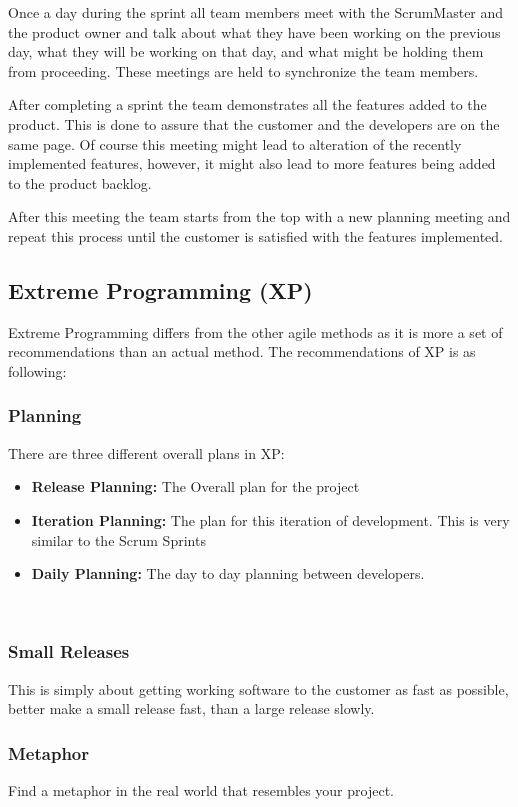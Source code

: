 Once a day during the sprint all team members meet with the ScrumMaster and the product owner and talk about what they have been working on the previous day, what they will be working on that day, and what might be holding them from proceeding. These meetings are held to synchronize the team members.

After completing a sprint the team demonstrates all the features added to the product. This is done to assure that the customer and the developers are on the same page.
Of course this meeting might lead to alteration of the recently implemented features, however, it might also lead to more features being added to the product backlog.

After this meeting the team starts from the top with a new planning meeting and repeat this process until the customer is satisfied with the features implemented.

\subsection{Extreme Programming (XP)}
Extreme Programming differs from the other agile methods as it is more a set of recommendations than an actual method. The recommendations of XP is as following:

\subsubsection{Planning}
There are three different overall plans in XP:
\begin{itemize}
	\item \textbf{Release Planning:} The Overall plan for the project
	\item \textbf{Iteration Planning:} The plan for this iteration of development. This is very similar to the Scrum Sprints
	\item \textbf{Daily Planning:} The day to day planning between developers.
\end{itemize}
\ \\
\subsubsection{Small Releases}
This is simply about getting working software to the customer as fast as possible, better make a small release fast, than a large release slowly.

\subsubsection{Metaphor}
Find a metaphor in the real world that resembles your project.

